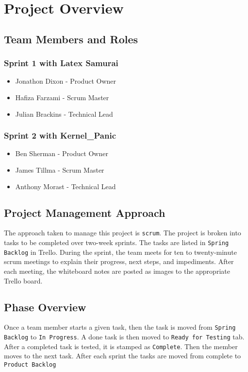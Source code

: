 

\chapter{Project Overview}



\section{Team Members and Roles}
\subsection{Sprint 1 with Latex Samurai}
\begin{itemize}
	\item Jonathon Dixon - Product Owner
	\item Hafiza Farzami - Scrum Master
	\item Julian Brackins - Technical Lead
\end{itemize}
\subsection{Sprint 2 with Kernel\_Panic}
\begin{itemize}
  \item Ben Sherman - Product Owner
  \item James Tillma - Scrum Master
  \item Anthony Morast - Technical Lead  
\end{itemize}


\section{Project  Management Approach}
The approach taken to manage this project is {\tt scrum}. The project is broken into tasks to be completed over two-week sprints. The tasks are listed in {\tt Spring Backlog} in Trello. During the sprint, the team meets for ten to twenty-minute scrum meetings to explain their progress, next steps, and impediments. After each meeting, the whiteboard notes are posted as images to the appropriate Trello board.


\section{Phase  Overview}
Once a team member starts a given task, then the task is moved from {\tt Spring Backlog} to {\tt In Progress}. A done task is then moved to {\tt Ready for Testing} tab. After a completed task is tested, it is stamped as {\tt Complete}. Then the member moves to the next task. After each sprint the tasks are moved from complete to {\tt Product Backlog}

 
